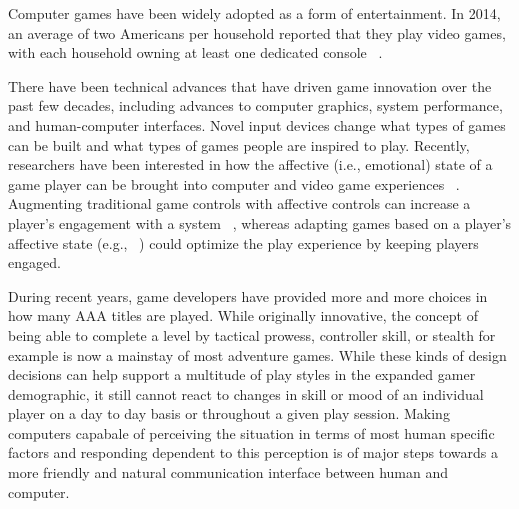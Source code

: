 
Computer games have been widely adopted as a form of entertainment. In 2014, an average of two Americans per household reported that they play video games, with each household owning at least one dedicated console ~\cite{entertainment2014essential}.


There have been technical advances that have driven game innovation over the past few decades, including advances to computer graphics, system performance, and human-computer interfaces. Novel input devices change what types of games can be built and what types of games people are inspired to play. Recently, researchers have been interested in how the affective (i.e., emotional) state of a game player can be brought into computer and video game experiences ~\cite{gilleade2005affective}. Augmenting traditional game controls with affective controls can increase a player’s engagement with a system ~\cite{nacke2011biofeedback}, whereas adapting games based on a player’s affective state (e.g., ~\cite{dekker2007please, epp2011identifying}) could optimize the play experience by keeping players engaged.

During recent years, game developers have provided more and more choices in how many AAA titles are played. While originally innovative, the concept of being able to complete a level by tactical prowess, controller skill, or stealth for example is now a mainstay of most adventure games. While these kinds of design decisions can help support a multitude of play styles in the expanded gamer demographic, it still cannot react to changes in skill or mood of an individual player on a day to day basis or throughout a given play session. Making computers capabale of perceiving the situation in terms of most human specific factors and responding dependent to this perception is of major steps towards a more friendly and natural communication interface between human and computer.


